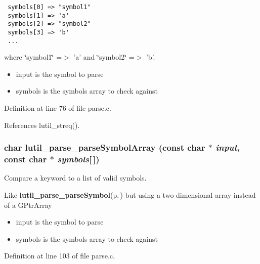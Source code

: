 \footnotesize\begin{verbatim} symbols[0] => "symbol1"
 symbols[1] => 'a'
 symbols[2] => "symbol2"
 symbols[3] => 'b'
 ...
\end{verbatim}
\normalsize
where \char`\"{}symbol1\char`\"{} =$>$ 'a' and \char`\"{}symbol2\char`\"{} =$>$ 'b'.

\begin{itemize}
\item input is the symbol to parse \item symbols is the symbols array to check against 
\end{itemize}


Definition at line 76 of file parse.c.

References lutil\_\-streq().
\subsubsection{\setlength{\rightskip}{0pt plus 5cm}char lutil\_\-parse\_\-parse\-Symbol\-Array (const char $\ast$ {\em input}, const char $\ast$ {\em symbols}[$\,$])}\label{parse_8c_a2}


Compare a keyword to a list of valid symbols. 

Like {\bf lutil\_\-parse\_\-parse\-Symbol}{\rm (p.\,\pageref{parse_8h_a1})} but using a two dimensional array instead of a GPtr\-Array

\begin{itemize}
\item input is the symbol to parse \item symbols is the symbols array to check against 
\end{itemize}


Definition at line 103 of file parse.c.

